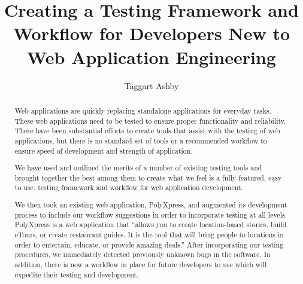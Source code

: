 \documentclass[12pt]{ucthesis}
\begin{document}

\title{Creating a Testing Framework and Workflow for Developers New to Web Application Engineering} %
\author{Taggart Ashby}
  
 
     

\maketitle

\begin{frontmatter}

\copyrightpage

\committeemembershippage

\begin{abstract}
Web applications are quickly replacing standalone applications for everyday tasks. These web applications need to be tested to ensure proper functionality and reliability. There have been substantial efforts to create tools that assist with the testing of web applications, but there is no standard set of tools or a recommended workflow to ensure speed of development and strength of application.

We have used and outlined the merits of a number of existing testing tools and brought together the best among them to create what we feel is a fully-featured, easy to use, testing framework and workflow for web application development.

We then took an existing web application, PolyXpress, and augmented its development process to include our workflow suggestions in order to incorporate testing at all levels. PolyXpress is a web application that ``allows you to create location-based stories, build eTours, or create restaurant guides. It is the tool that will bring people to locations in order to entertain, educate, or provide amazing deals.''\cite{PX} After incorporating our testing procedures, we immediately detected previously unknown bugs in the software. In addition, there is now a workflow in place for future developers to use which will expedite their testing and development.
\end{abstract}

\tableofcontents

\end{frontmatter}
\end{document}
